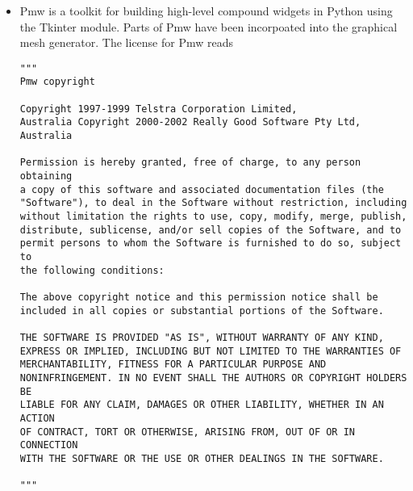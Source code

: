 \begin{itemize}
\pagebreak
\item Pmw is a toolkit for building high-level compound widgets in
Python using the Tkinter module. Parts of Pmw have been incorpoated
into the graphical mesh generator. The license for Pmw reads

\begin{verbatim}
"""
Pmw copyright

Copyright 1997-1999 Telstra Corporation Limited,
Australia Copyright 2000-2002 Really Good Software Pty Ltd, Australia

Permission is hereby granted, free of charge, to any person obtaining
a copy of this software and associated documentation files (the
"Software"), to deal in the Software without restriction, including
without limitation the rights to use, copy, modify, merge, publish,
distribute, sublicense, and/or sell copies of the Software, and to
permit persons to whom the Software is furnished to do so, subject to
the following conditions:

The above copyright notice and this permission notice shall be
included in all copies or substantial portions of the Software.

THE SOFTWARE IS PROVIDED "AS IS", WITHOUT WARRANTY OF ANY KIND,
EXPRESS OR IMPLIED, INCLUDING BUT NOT LIMITED TO THE WARRANTIES OF
MERCHANTABILITY, FITNESS FOR A PARTICULAR PURPOSE AND
NONINFRINGEMENT. IN NO EVENT SHALL THE AUTHORS OR COPYRIGHT HOLDERS BE
LIABLE FOR ANY CLAIM, DAMAGES OR OTHER LIABILITY, WHETHER IN AN ACTION
OF CONTRACT, TORT OR OTHERWISE, ARISING FROM, OUT OF OR IN CONNECTION
WITH THE SOFTWARE OR THE USE OR OTHER DEALINGS IN THE SOFTWARE.

"""
\end{verbatim}
\end{itemize}
